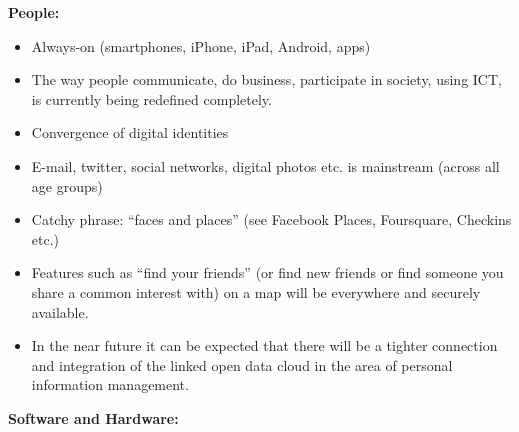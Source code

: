 \documentclass[10pt, plain]{../../metanetpaper}
\begin{document}
\begin{multicols}{2}
\textbf{People:}

\begin{itemize}
\item Always-on (smartphones, iPhone, iPad, Android, apps)
\item The way people communicate, do business, participate in society, using ICT, is currently being redefined completely.
\item Convergence of digital identities
\item E-mail, twitter, social networks, digital photos etc. is mainstream (across all age groups)
\item Catchy phrase: “faces and places” (see Facebook Places, Foursquare, Checkins etc.)
\item Features such as “find your friends” (or find new friends or find someone you share a common interest with) on a map will be everywhere and securely available.
\item In the near future it can be expected that there will be a tighter connection and integration of the linked open data cloud in the area of personal information management.
\end{itemize}

\textbf{Software and Hardware:}


\end{multicols}
\end{document}
